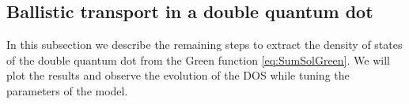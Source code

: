


\subsection{Ballistic transport in a  double quantum dot \label{sec:GreedDQD}}

In this subsection we describe the remaining steps to extract the density of states of the double quantum dot from the Green function \ref{eq:SumSolGreen}. We will plot the results and observe the evolution of the DOS while tuning the parameters of the model. 

